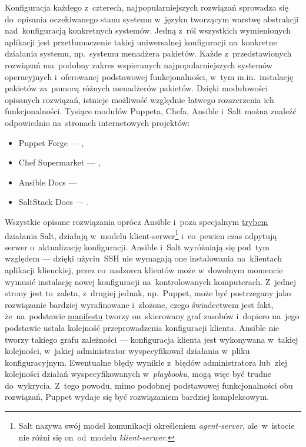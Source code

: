 \documentclass[thesis]{subfiles}
\begin{document}
Konfiguracja każdego z~czterech, najpopularniejszych rozwiązań sprowadza się do~opisania oczekiwanego stanu systemu w~języku tworzącym warstwę abstrakcji nad~konfiguracją konkretnych systemów. Jedną z~ról wszystkich wymienionych aplikacji jest przetłumaczenie takiej uniwersalnej konfiguracji na~konkretne działania systemu, np.~systemu menadżera pakietów. Każde z~przedstawionych rozwiązań ma~podobny zakres wspieranych najpopularniejszych systemów operacyjnych i~oferowanej podstawowej funkcjonalności, w~tym m.in.~instalację pakietów za~pomocą różnych menadżerów pakietów. Dzięki modułowości opisanych rozwiązań, istnieje możliwość względnie łatwego rozszerzenia ich funkcjonalności. Tysiące modułów Puppeta, Chefa, Ansible i~Salt można znaleźć odpowiednio na~stronach internetowych projektów:\mynobreakpar
\begin{itemize}
	\item Puppet Forge --- ,
	\item Chef Supermarket --- ,
	\item Ansible Docs --- 
	\item SaltStack Docs --- .
\end{itemize}

Wszystkie opisane rozwiązania oprócz Ansible i~poza specjalnym \href{https://docs.saltstack.com/en/latest/topics/ssh/}{trybem} działania Salt, działają w~modelu klient-serwer\footnote{Salt nazywa swój model komunikacji określeniem \emph{agent-server}, ale~w~istocie nie różni się on~od~modelu \emph{klient-serwer}.} i~co~pewien czas odpytują serwer o~aktualizację konfiguracji. Ansible i~Salt wyróżniają się pod~tym względem --- dzięki użyciu~SSH nie wymagają one instalowania na~klientach aplikacji klienckiej, przez co~nadzorca klientów może w~dowolnym momencie wymusić instalację nowej konfiguracji na~kontrolowanych komputerach. Z~jednej strony jest to~zaleta, z~drugiej jednak, np.~Puppet, może być postrzegany jako rozwiązanie bardziej wyrafinowane i~złożone, czego świadectwem jest fakt, że~na~podstawie \hyperref[sec:puppet]{manifestu} tworzy on~skierowany graf zasobów i~dopiero na~jego podstawie ustala kolejność przeprowadzenia konfiguracji klienta. Ansible nie tworzy takiego grafu zależności --- konfiguracja klienta jest wykonywana w~takiej kolejności, w~jakiej administrator wyspecyfikował działania w~pliku konfiguracyjnym. Ewentualne błędy wynikłe z~błędów administratora lub~złej kolejności działań wyspecyfikowanych w~\emph{playbooku}, mogą więc być trudne do~wykrycia. Z~tego powodu, mimo podobnej podstawowej funkcjonalności obu rozwiązań, Puppet wydaje się być rozwiązaniem bardziej kompleksowym.
\end{document}
